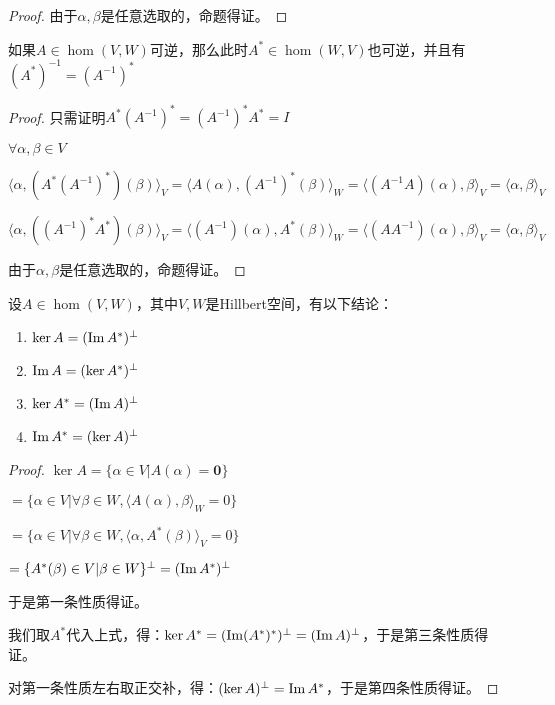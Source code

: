 \documentclass[12pt, a4paper, oneside, UTF8]{ctexbook}
\begin{document}
\begin{para}{0}
\begin{proof}
						由于$\alpha ,\beta $是任意选取的，命题得证。
					\end{proof}
				\point{}
					\begin{proposition}
						如果$A \in \hom(V,W)$可逆，那么此时$A^* \in \hom(W,V)$也可逆，并且有$(A^*)^{-1}=(A^{-1})^*$
					\end{proposition}
					\begin{proof}
						只需证明$A^*(A^{-1})^* = (A^{-1})^*A^*=I$

						$\forall \alpha,\beta  \in V$

						$\langle \alpha ,(A^*(A^{-1})^*)(\beta )\rangle_V =\langle A(\alpha ),(A^{-1})^*(\beta )\rangle_W=\langle (A^{-1}A)(\alpha ),\beta \rangle_V=\langle \alpha ,\beta \rangle_V$

						$\langle \alpha ,((A^{-1})^*A^*)(\beta )\rangle_V =\langle (A^{-1})(\alpha ),A^*(\beta )\rangle_W=\langle (AA^{-1})(\alpha ),\beta \rangle_V=\langle \alpha ,\beta \rangle_V$

						由于$\alpha ,\beta $是任意选取的，命题得证。
					\end{proof}
				\point{}
					\begin{proposition}
						设$A\in \hom(V,W)$，其中$V,W$是Hillbert空间，有以下结论：
						\begin{enumerate}
							\item $\ker A = (\operatorname{Im} A^*)^{\perp}$
							\item $\operatorname{Im} A = (\ker A^*)^{\perp}$
							\item $\ker A^* = (\operatorname{Im} A)^{\perp}$
							\item $\operatorname{Im} A^* = (\ker A)^{\perp}$
						\end{enumerate}
					\end{proposition}
					\begin{proof}
						$\ker A=\{\alpha \in V| A(\alpha )=\mathbf{0}\}$

						$=\{\alpha \in V| \forall \beta \in W,\langle A(\alpha ),\beta \rangle_W =0\}$

						$=\{\alpha \in V| \forall \beta \in W,\langle \alpha ,A^*(\beta )\rangle_V =0\}$

						$=\{A^*(\beta )  \in V|\beta \in W\}^{\perp}=(\operatorname{Im} A^*)^{\perp}$

						于是第一条性质得证。

						我们取$A^*$代入上式，得：$\ker A^* = (\operatorname{Im} (A^*)^*)^{\perp}=(\operatorname{Im} A)^{\perp}$，于是第三条性质得证。

						对第一条性质左右取正交补，得：$(\ker A)^{\perp} = \operatorname{Im} A^*$，于是第四条性质得证。


\end{proof}
\end{para}
\end{document}
